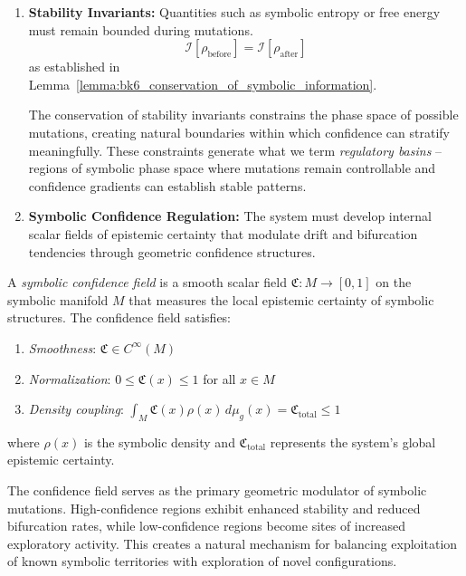\begin{enumerate}
\item \textbf{Stability Invariants:} Quantities such as symbolic entropy or free energy must remain bounded during mutations.
\begin{equation}
\mathcal{I}[\rho_{\text{before}}] = \mathcal{I}[\rho_{\text{after}}]
\end{equation}
as established in Lemma~\ref{lemma:bk6_conservation_of_symbolic_information}.

The conservation of stability invariants constrains the phase space of possible mutations, creating natural boundaries within which confidence can stratify meaningfully. These constraints generate what we term \emph{regulatory basins} -- regions of symbolic phase space where mutations remain controllable and confidence gradients can establish stable patterns.

\item \textbf{Symbolic Confidence Regulation:} The system must develop internal scalar fields of epistemic certainty that modulate drift and bifurcation tendencies through geometric confidence structures.
\end{enumerate}

\begin{definition}
\label{definition:bk6_symbolic_confidence_field}
A \emph{symbolic confidence field} is a smooth scalar field $\mathfrak{C}: M \to [0,1]$ on the symbolic manifold $M$ that measures the local epistemic certainty of symbolic structures. The confidence field satisfies:
\begin{enumerate}
\item \emph{Smoothness}: $\mathfrak{C} \in C^\infty(M)$
\item \emph{Normalization}: $0 \leq \mathfrak{C}(x) \leq 1$ for all $x \in M$
\item \emph{Density coupling}: $\int_M \mathfrak{C}(x) \rho(x) \, d\mu_g(x) = \mathfrak{C}_{\text{total}} \leq 1$
\end{enumerate}
where $\rho(x)$ is the symbolic density and $\mathfrak{C}_{\text{total}}$ represents the system's global epistemic certainty.
\end{definition}

The confidence field serves as the primary geometric modulator of symbolic mutations. High-confidence regions exhibit enhanced stability and reduced bifurcation rates, while low-confidence regions become sites of increased exploratory activity. This creates a natural mechanism for balancing exploitation of known symbolic territories with exploration of novel configurations.

